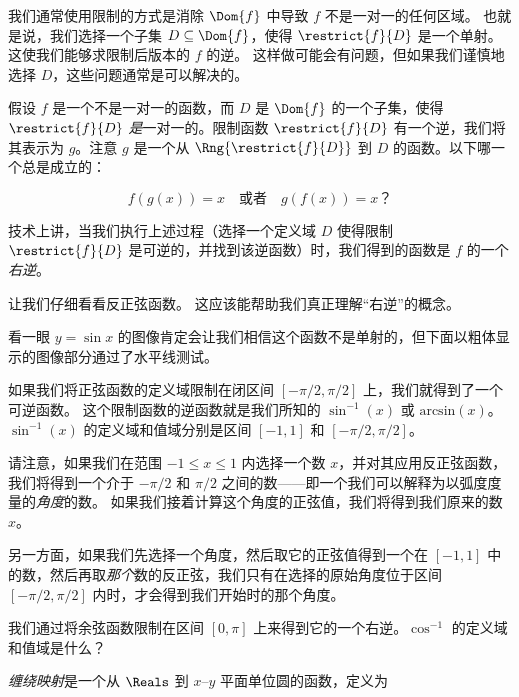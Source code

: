 我们通常使用限制的方式是消除 $\Dom{f}$ 中导致 $f$ 不是一对一的任何区域。
也就是说，我们选择一个子集 $D \subseteq \Dom{f}$，使得 $\restrict{f}{D}$ 是一个单射。
这使我们能够求限制后版本的 $f$ 的逆。
这样做可能会有问题，但如果我们谨慎地选择 $D$，这些问题通常是可以解决的。

\begin{exer}
假设 $f$ 是一个不是一对一的函数，而 $D$ 是 $\Dom{f}$ 的一个子集，使得 $\restrict{f}{D}$ \emph{是}一对一的。限制函数 $\restrict{f}{D}$ 有一个逆，我们将其表示为 $g$。注意 $g$ 是一个从 $\Rng{\restrict{f}{D}}$ 到 $D$ 的函数。以下哪一个总是成立的：

\[ f(g(x)) = x \quad \mbox{或者} \quad g(f(x)) = x ？ \]
\end{exer}

技术上讲，当我们执行上述过程（选择一个定义域 $D$ 使得限制 $\restrict{f}{D}$ 是可逆的，并找到该逆函数）时，我们得到的函数是 $f$ 的一个 \emph{右逆}。

让我们仔细看看反正弦函数。
这应该能帮助我们真正理解“右逆”的概念。

看一眼 $y = \sin{x}$ 的图像肯定会让我们相信这个函数不是单射的，但下面以粗体显示的图像部分通过了水平线测试。

\begin{center}

\end{center}

如果我们将正弦函数的定义域限制在闭区间 $[-\pi/2, \pi/2]$ 上，我们就得到了一个可逆函数。
这个限制函数的逆函数就是我们所知的 $\sin^{-1}(x)$ 或 $\mbox{arcsin}(x)$。
$\sin^{-1}(x)$ 的定义域和值域分别是区间 $[-1,1]$ 和 $[-\pi/2, \pi/2]$。

请注意，如果我们在范围 $-1 \leq x \leq 1$ 内选择一个数 $x$，并对其应用反正弦函数，我们将得到一个介于 $-\pi/2$ 和 $\pi/2$ 之间的数——即一个我们可以解释为以弧度度量的\emph{角度}的数。
如果我们接着计算这个角度的正弦值，我们将得到我们原来的数 $x$。

另一方面，如果我们先选择一个角度，然后取它的正弦值得到一个在 $[-1,1]$ 中的数，然后再取\emph{那个}数的反正弦，我们只有在选择的原始角度位于区间 $[-\pi/2, \pi/2]$ 内时，才会得到我们开始时的那个角度。

\begin{exer}
我们通过将余弦函数限制在区间 $[0,\pi]$ 上来得到它的一个右逆。$\cos^{-1}$ 的定义域和值域是什么？
\end{exer}

\emph{缠绕映射}是一个从 $\Reals$ 到 $x$--$y$ 平面单位圆的函数，定义为

